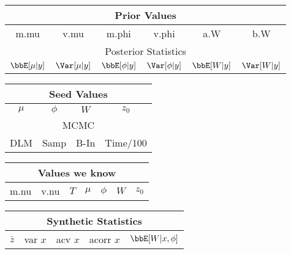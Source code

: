 \begin{tabular}{| c | c | c | c | c | c|}
\hline
\multicolumn{6}{|c|}{Prior Values} \\
\hline
m.mu & v.mu & m.phi & v.phi & a.W & b.W \\
\hline
\hline
\multicolumn{6}{|c|}{Posterior Statistics} \\
\hline
$\bbE[\mu|y]$ & $\Var[\mu|y]$ & 
$\bbE[\phi|y]$ & $\Var[\phi|y]$ & 
$\bbE[W|y]$ & $\Var[W|y]$ \\
\hline
\hline
\end{tabular}
%
\begin{tabular}{| c | c | c | c |}
\hline
\multicolumn{4}{|c|}{Seed Values} \\
\hline
$\mu$ & $\phi$ & $W$ & $z_0$ \\
\hline
\hline
\multicolumn{4}{|c|}{MCMC} \\
\hline
DLM & Samp & B-In & Time/100 \\
\hline
\hline
\end{tabular}

\vspace{3pt}

\begin{tabular}{| c | c | c | c | c | c | c |}
\hline
\multicolumn{7}{|c|}{Values we know} \\
\hline
m.nu & v.nu & $T$ & $\mu$ & $\phi$ & $W$ & $z_0$ \\
\hline
\hline
\end{tabular}
%
\begin{tabular}{| c | c | c | c | c |}
\hline
\multicolumn{5}{|c|}{Synthetic Statistics} \\
\hline
$\bar z$ & var $x$ & acv $x$ & acorr $x$ & $\bbE[W|x,\phi]$ \\
\hline
\hline
\end{tabular}